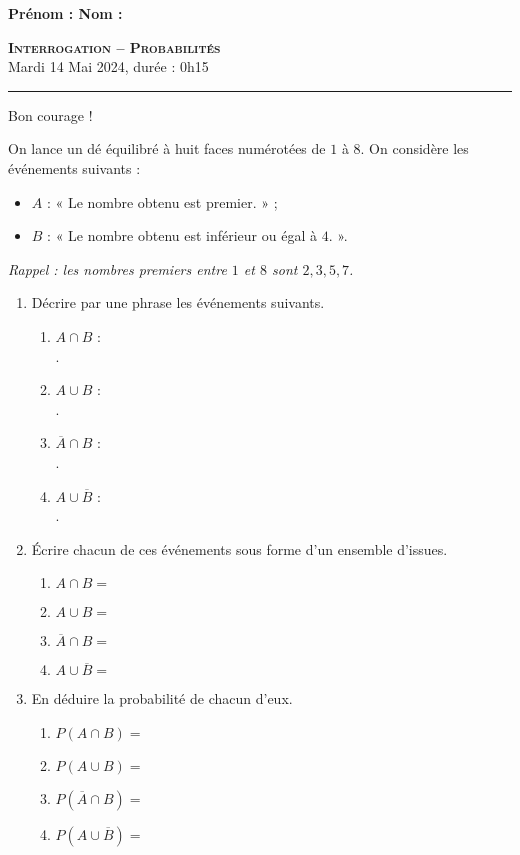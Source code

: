 \documentclass[11pt]{article}
\begin{document}
\textbf{Prénom : \hfill Nom : \hfill~}\\[5mm]
\begin{center}
\textbf{\LARGE \textsc{Interrogation -- Probabilités}}\\[2mm]

{\large Mardi 14 Mai 2024, durée : 0h15}\\[1mm]
\noindent\rule{12cm}{0.4pt}
\end{center}

\vspace{2mm}
\begin{center}
  Bon courage !
\end{center}

%
%

\begin{exo}
  On lance un dé équilibré à huit faces numérotées de $1$ à $8$. On considère
  les événements suivants :
  \begin{itemize}
    \item $A$ : « Le nombre obtenu est premier. » ;
    \item $B$ : « Le nombre obtenu est inférieur ou égal à $4$. ».
  \end{itemize}
  \emph{Rappel : les nombres premiers entre $1$ et $8$ sont $2, 3, 5, 7$.}
  \begin{enumerate}
    \item Décrire par une phrase les événements suivants.
      {
      \begin{enumerate}
        \item $A\cap B$ : \dotfill\\.\dotfill
        \item $A\cup B$ : \dotfill\\.\dotfill
        \item $\overline A\cap B$ : \dotfill\\.\dotfill
        \item $A\cup \overline B$ : \dotfill\\.\dotfill
      \end{enumerate}
    }
    \item Écrire chacun de ces événements sous forme d'un ensemble d'issues.
      {
      \begin{enumerate}
        \item $A\cap B =$
        \item $A\cup B=$
        \item $\overline A\cap B=$
        \item $A\cup \overline B=$
      \end{enumerate}
    }
    \item En déduire la probabilité de chacun d'eux.
      {
      \begin{enumerate}
        \item $P(A\cap B) =$
        \item $P(A\cup B)=$
        \item $P(\overline A\cap B)=$
        \item $P(A\cup \overline B)=$
      \end{enumerate}
    }
  \end{enumerate}
\end{exo}
\end{document}
